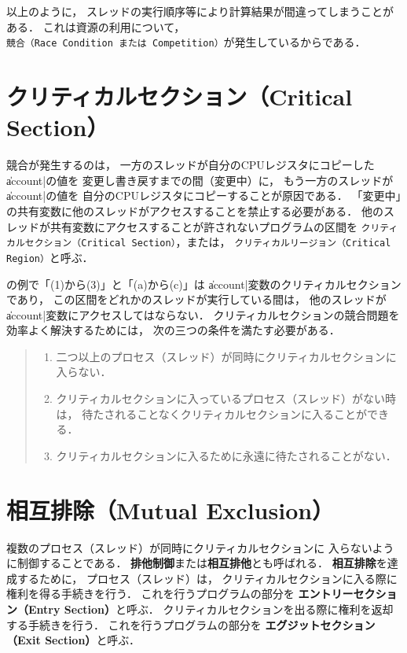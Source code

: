 以上のように，
スレッドの実行順序等により計算結果が間違ってしまうことがある．
これは資源の利用について，
{\tt 競合（Race Condition または Competition）}が発生しているからである．

\section{クリティカルセクション（Critical Section）}
\label{criticalsection}
競合が発生するのは，
一方のスレッドが自分のCPUレジスタにコピーした\|account|の値を
変更し書き戻すまでの間（変更中）に，
もう一方のスレッドが\|account|の値を
自分のCPUレジスタにコピーすることが原因である．
「変更中」の共有変数に他のスレッドがアクセスすることを禁止する必要がある．
他のスレッドが共有変数にアクセスすることが許されないプログラムの区間を
{\tt クリティカルセクション（Critical Section）}，または，
{\tt クリティカルリージョン（Critical Region）}と呼ぶ．

の例で「(1)から(3)」と「(a)から(c)」は
\|account|変数のクリティカルセクションであり，
この区間をどれかのスレッドが実行している間は，
他のスレッドが\|account|変数にアクセスしてはならない．
クリティカルセクションの競合問題を効率よく解決するためには，
次の三つの条件を満たす必要がある．

\begin{quote}
\begin{enumerate}
\item 二つ以上のプロセス（スレッド）が同時にクリティカルセクションに入らない．
\item クリティカルセクションに入っているプロセス（スレッド）がない時は，
待たされることなくクリティカルセクションに入ることができる．
\item クリティカルセクションに入るために永遠に待たされることがない．
\end{enumerate}
\end{quote}

\section{相互排除（Mutual Exclusion）}
複数のプロセス（スレッド）が同時にクリティカルセクションに
入らないように制御することである．
{\bf 排他制御}または{\bf 相互排他}とも呼ばれる．
{\bf 相互排除}を達成するために，
プロセス（スレッド）は，
クリティカルセクションに入る際に権利を得る手続きを行う．
これを行うプログラムの部分を
{\bf エントリーセクション（Entry Section）}と呼ぶ．
クリティカルセクションを出る際に権利を返却する手続きを行う．
これを行うプログラムの部分を
{\bf エグジットセクション（Exit Section）}と呼ぶ．

